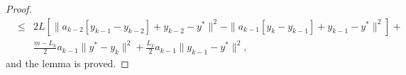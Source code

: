 \documentclass[11pt]{article}
\begin{document}
\begin{proof}
\begin{eqnarray*}
& \leq &   2 L [\|a_{k-2}[ y_{k-1} - y_{k-2}]  + y_{k-2} - y^\ast \|^2 - \| a_{k-1}[ y_{k} - y_{k-1}]  + y_{k-1} - y^\ast \|^2] + \\
&   & \frac{\underline{m} - L_k}{2}a_{k-1} \| y^\ast - y_{k} \|^2 + \frac{L_k}{2}a_{k-1} \| y_{k-1} - y^\ast \|^2, 
\end{eqnarray*}
and the lemma is proved.

\end{proof}
\end{document}
